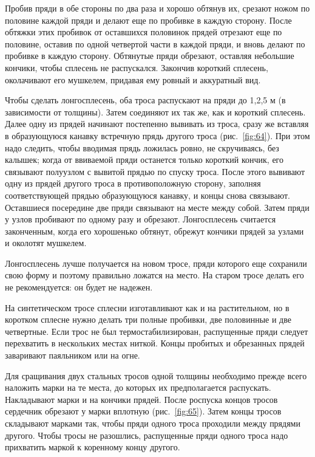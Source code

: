 \documentclass[a4paper, 12pt, twoside, final]{scrbook}
\begin{document}
Пробив пряди в обе стороны по два раза и хорошо обтянув их, срезают ножом по половине каждой пряди и делают еще по пробивке в каждую сторону. После обтяжки этих пробивок от оставшихся половинок прядей отрезают еще по половине, оставив по одной четвертой части в каждой пряди, и вновь делают по пробивке в каждую сторону. Обтянутые пряди обрезают, оставляя небольшие кончики, чтобы сплесень не распускался. Закончив короткий сплесень, околачивают его мушкелем, придавая ему ровный и аккуратный вид.

Чтобы сделать лонгосплесень, оба троса распускают на пряди до 1,2,5 м (в зависимости от толщины). Затем соединяют их так же, как и короткий сплесень. Далее одну из прядей начинают постепенно вывивать из троса, сразу же вставляя в образующуюся канавку встречную прядь другого троса (рис.~\ref{fig:64}). При этом надо следить, чтобы вводимая прядь ложилась ровно, не скручиваясь, без калышек; когда от ввиваемой пряди останется только короткий кончик, его связывают полуузлом с вывитой прядью по спуску троса. После этого вывивают одну из прядей другого троса в противоположную сторону, заполняя соответствующей прядью образующуюся канавку, и концы снова связывают. Оставшиеся посередине две пряди связывают на месте между собой. Затем пряди у узлов пробивают по одному разу и обрезают. Лонгосплесень считается законченным, когда его хорошенько обтянут, обрежут кончики прядей за узлами и околотят мушкелем.

Лонгосплесень лучше получается на новом тросе, пряди которого еще сохранили свою форму и поэтому правильно ложатся на место. На старом тросе делать его не рекомендуется: он будет не надежен.

На синтетическом тросе сплесни изготавливают как и на растительном, но в коротком сплесне нужно делать три полные пробивки, две половинные и две четвертные. Если трос не был термостабилизирован, распущенные пряди следует перехватить в нескольких местах ниткой. Концы пробитых и обрезанных прядей заваривают паяльником или на огне.

Для сращивания двух стальных тросов одной толщины необходимо прежде всего наложить марки на те места, до которых их предполагается распускать. Накладывают марки и на кончики прядей. После роспуска концов тросов сердечник обрезают у марки вплотную (рис.~\ref{fig:65}). Затем концы тросов складывают марками так, чтобы пряди одного троса проходили между прядями другого. Чтобы тросы не разошлись, распущенные пряди одного троса надо прихватить маркой к коренному концу другого.
\end{document}
